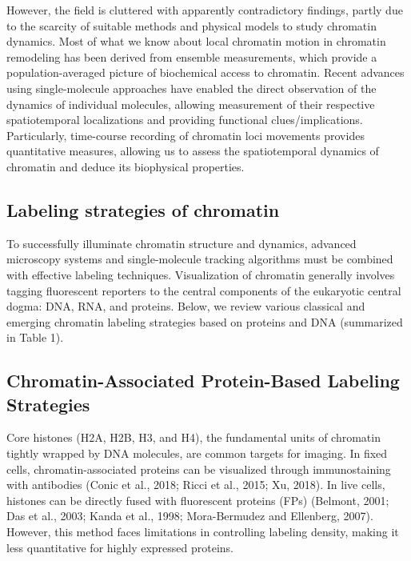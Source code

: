 However, the field is cluttered with apparently contradictory findings, partly due to the scarcity of suitable methods and physical models to study chromatin dynamics. Most of what we know about local chromatin motion in chromatin remodeling has been derived from ensemble measurements, which provide a population-averaged picture of biochemical access to chromatin. Recent advances using single-molecule approaches have enabled the direct observation of the dynamics of individual molecules, allowing measurement of their respective spatiotemporal localizations and providing functional clues/implications. Particularly, time-course recording of chromatin loci movements provides quantitative measures, allowing us to assess the spatiotemporal dynamics of chromatin and deduce its biophysical properties.

\subsection{Labeling strategies of chromatin}

To successfully illuminate chromatin structure and dynamics, advanced microscopy systems and single-molecule tracking algorithms must be combined with effective labeling techniques. Visualization of chromatin generally involves tagging fluorescent reporters to the central components of the eukaryotic central dogma: DNA, RNA, and proteins. Below, we review various classical and emerging chromatin labeling strategies based on proteins and DNA (summarized in Table 1).

\subsection{Chromatin-Associated Protein-Based Labeling Strategies}

Core histones (H2A, H2B, H3, and H4), the fundamental units of chromatin tightly wrapped by DNA molecules, are common targets for imaging. In fixed cells, chromatin-associated proteins can be visualized through immunostaining with antibodies (Conic et al., 2018; Ricci et al., 2015; Xu, 2018). In live cells, histones can be directly fused with fluorescent proteins (FPs) (Belmont, 2001; Das et al., 2003; Kanda et al., 1998; Mora-Bermudez and Ellenberg, 2007). However, this method faces limitations in controlling labeling density, making it less quantitative for highly expressed proteins.

